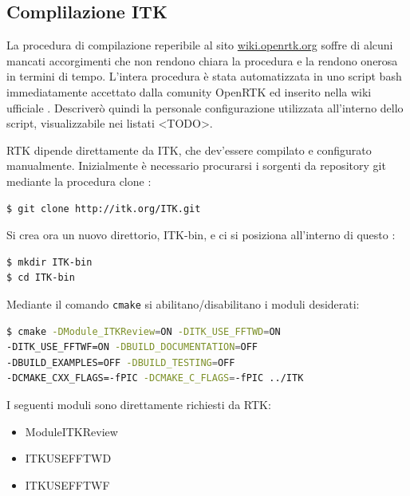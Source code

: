 \documentclass[a4paper,12pt, doubleside]{report}
\begin{document}
            \subsection{Complilazione ITK}
                \par
                    La procedura di compilazione reperibile al sito \url{wiki.openrtk.org} soffre di alcuni mancati accorgimenti che non rendono chiara la procedura e la rendono onerosa in termini di tempo. L'intera procedura è stata automatizzata in uno script bash immediatamente accettato dalla comunity OpenRTK ed inserito nella wiki ufficiale
                    \cite{wiki-rtk}. Descriverò quindi la personale configurazione utilizzata all'interno dello script, visualizzabile nei listati <TODO>.
                \par    
                    RTK dipende direttamente da ITK, che dev'essere compilato e configurato manualmente. 
                    Inizialmente è necessario procurarsi i sorgenti da repository git mediante la procedura clone :
                    \begin{lstlisting}[language=bash, frame=bt]
$ git clone http://itk.org/ITK.git
                    \end{lstlisting}
                    
                    \bigskip
                    Si crea ora un nuovo direttorio, ITK-bin, e ci si posiziona all'interno di questo :
                    \begin{lstlisting}[language=bash, frame=bt]
$ mkdir ITK-bin
$ cd ITK-bin
                    \end{lstlisting}
                    
                    \bigskip
                    Mediante il comando \texttt{cmake} si abilitano/disabilitano i moduli desiderati:
                    
                    \begin{lstlisting}[language=bash, frame=bt]
$ cmake -DModule_ITKReview=ON -DITK_USE_FFTWD=ON 
-DITK_USE_FFTWF=ON -DBUILD_DOCUMENTATION=OFF 
-DBUILD_EXAMPLES=OFF -DBUILD_TESTING=OFF 
-DCMAKE_CXX_FLAGS=-fPIC -DCMAKE_C_FLAGS=-fPIC ../ITK
                    \end{lstlisting}
                    
                    I seguenti moduli sono direttamente richiesti da RTK:
                    \begin{itemize}
                        \item Module\textunderscore ITKReview
                        \item ITK\textunderscore USE\textunderscore FFTWD
                        \item ITK\textunderscore USE\textunderscore FFTWF
                    \end{itemize}
                    
\end{document}
